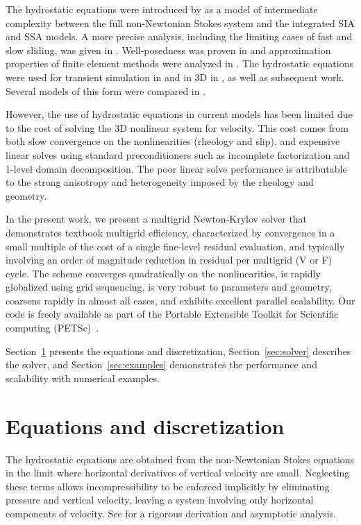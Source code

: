 \documentclass[3p]{elsarticle}
\begin{document}
The hydrostatic equations were introduced by \cite{blatter1995vas} as a model of intermediate complexity between the full non-Newtonian Stokes system and the integrated SIA and SSA models.  A more precise analysis, including the limiting cases of fast and slow sliding, was given in \cite{schoof2010thin}.  Well-posedness was proven in \cite{colinge1999strongly} and approximation properties of finite element methods were analyzed in \cite{glowinski2003approximation,chow2004finite}.  The hydrostatic equations were used for transient simulation in \cite{pattyn2002tgr} and in 3D in \cite{pattyn2003ntd}, as well as subsequent work. Several models of this form were compared in \cite{pattyn2008beh}.

However, the use of hydrostatic equations in current models has been limited due to the cost of solving the 3D nonlinear system for velocity.  This cost comes from both slow convergence on the
nonlinearities (rheology and slip), and expensive linear solves using standard preconditioners such
as incomplete factorization and 1-level domain decomposition.  The poor linear solve performance is
attributable to the strong anisotropy and heterogeneity imposed by the rheology and geometry.

In the present work, we present a multigrid Newton-Krylov solver that demonstrates textbook
multigrid efficiency, characterized by convergence in a small multiple of the cost of a single
fine-level residual evaluation, and typically involving an order of magnitude reduction in residual
per multigrid (V or F) cycle.  The scheme converges quadratically on the nonlinearities, is rapidly
globalized using grid sequencing, is very robust to parameters and geometry, coarsens rapidly in
almost all cases, and exhibits excellent parallel scalability.  Our code is freely available as part
of the Portable Extensible Toolkit for Scientific computing (PETSc)~\cite{petsc-web-page}.

Section~\ref{sec:equations} presents the equations and discretization, Section~\ref{sec:solver}
describes the solver, and Section~\ref{sec:examples} demonstrates the performance and scalability
with numerical examples.

\section{Equations and discretization}\label{sec:equations}
The hydrostatic equations are obtained from the non-Newtonian Stokes equations in the limit where
horizontal derivatives of vertical velocity are small.  Neglecting these terms allows
incompressibility to be enforced implicitly by eliminating pressure and vertical velocity, leaving a
system involving only horizontal components of velocity.  See \cite{schoof2010thin} for a rigorous
derivation and asymptotic analysis.
\end{document}
